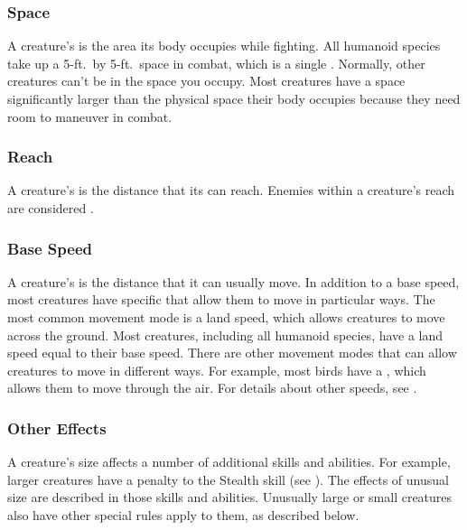         \subsubsection{Space}\label{Space}
            A creature's  is the area its body occupies while fighting.
            All humanoid species take up a 5-ft.\ by 5-ft.\ space in combat, which is a single .
            Normally, other creatures can't be in the space you occupy.
            Most creatures have a space significantly larger than the physical space their body occupies because they need room to maneuver in combat.

        \subsubsection{Reach}\label{Reach}
            A creature's  is the distance that its  can reach.
            Enemies within a creature's reach are considered .

        \subsubsection{Base Speed}\label{Base Speed}
            A creature's  is the distance that it can usually move.
            In addition to a base speed, most creatures have specific  that allow them to move in particular ways.
            The most common movement mode is a land speed, which allows creatures to move across the ground.
            Most creatures, including all humanoid species, have a land speed equal to their base speed.
            There are other movement modes that can allow creatures to move in different ways.
            For example, most birds have a , which allows them to move through the air.
            For details about other speeds, see .

        \subsubsection{Other Effects}
            A creature's size affects a number of additional skills and abilities.
            For example, larger creatures have a penalty to the Stealth skill (see ).
            The effects of unusual size are described in those skills and abilities.
            Unusually large or small creatures also have other special rules apply to them, as described below.

